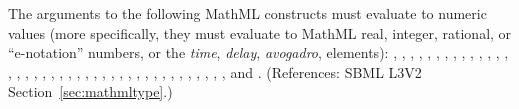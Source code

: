 The arguments to the following MathML constructs must evaluate to numeric
values (more specifically, they must evaluate to MathML real, integer,
rational, or ``e-notation'' numbers, or the \emph{time}, \emph{delay},
\emph{avogadro},   elements): , ,
, , , ,
, , , ,
, , , ,
, , , , ,
, , , , ,
, , , , , , ,
, , , , , , ,
, , and .  (References: SBML L3V2
Section~\ref{sec:mathmltype}.)
